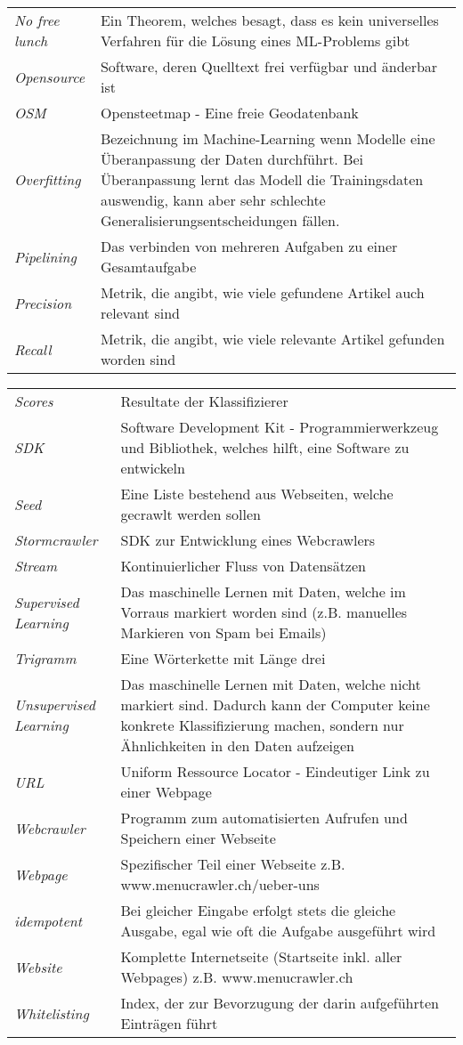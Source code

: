 \begin{table}[H]
\begin{tabular}{>{\em}p{4cm}p{12cm}}
		No free lunch & Ein Theorem, welches besagt, dass es kein universelles Verfahren für die Lösung eines ML-Problems gibt\\
		Opensource & Software, deren Quelltext frei verfügbar und änderbar ist\\
		OSM & Opensteetmap - Eine freie Geodatenbank\\
		Overfitting & Bezeichnung im Machine-Learning wenn Modelle eine Überanpassung der Daten durchführt. Bei Überanpassung lernt das Modell die Trainingsdaten auswendig, kann aber sehr schlechte Generalisierungsentscheidungen fällen.\\
		Pipelining & Das verbinden von mehreren Aufgaben zu einer Gesamtaufgabe\\
		Precision & Metrik, die angibt, wie viele gefundene Artikel auch relevant sind\\
		Recall & Metrik, die angibt, wie viele relevante Artikel gefunden worden sind\\
	\end{tabular}
\end{table}
\begin{table}[H]
	\begin{tabular}{>{\em}p{4cm}p{12cm}}
		Scores & Resultate der Klassifizierer\\
		SDK & Software Development Kit - Programmierwerkzeug und Bibliothek, welches hilft, eine Software zu entwickeln\\
		Seed & Eine Liste bestehend aus Webseiten, welche gecrawlt werden sollen\\
		Stormcrawler & SDK zur Entwicklung eines Webcrawlers\\
		Stream & Kontinuierlicher Fluss von Datensätzen\\
		Supervised Learning & Das maschinelle Lernen mit Daten, welche im Vorraus markiert worden sind (z.B. manuelles Markieren von Spam bei Emails)\\
		Trigramm & Eine Wörterkette mit Länge drei\\
		Unsupervised Learning & Das maschinelle Lernen mit Daten, welche nicht markiert sind. Dadurch kann der Computer keine konkrete Klassifizierung machen, sondern nur Ähnlichkeiten in den Daten aufzeigen\\
		URL & Uniform Ressource Locator - Eindeutiger Link zu einer Webpage\\
		Webcrawler & Programm zum automatisierten Aufrufen und Speichern einer Webseite\\
		Webpage & Spezifischer Teil einer Webseite z.B. www.menucrawler.ch/ueber-uns\\
		idempotent & Bei gleicher Eingabe erfolgt stets die gleiche Ausgabe, egal wie oft die Aufgabe ausgeführt wird\\
		Website & Komplette Internetseite (Startseite inkl. aller Webpages) z.B. www.menucrawler.ch\\
		Whitelisting & Index, der zur Bevorzugung der darin aufgeführten Einträgen führt\\	
	\end{tabular}
\end{table}